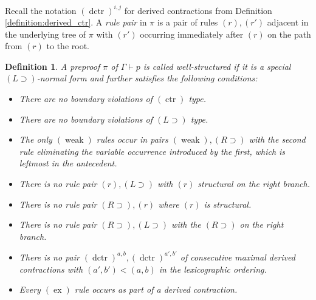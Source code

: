 \documentclass[english,letter paper,12pt,leqno]{article}
\theoremstyle{example}
\newtheorem{definition}[theorem]{Definition}
\numberwithin{equation}{section}
\def\imp{\supset}
\begin{document}
Recall the notation $(\operatorname{dctr})^{i,j}$ for derived contractions from Definition \ref{definition:derived_ctr}. A \emph{rule pair} in $\pi$ is a pair of rules $(r),(r')$ adjacent in the underlying tree of $\pi$ with $(r')$ occurring immediately after $(r)$ on the path from $(r)$ to the root.

\begin{definition} A preproof $\pi$ of $\Gamma \vdash p$ is called \emph{well-structured} if it is a special $(L \imp)$-normal form and further satisfies the following conditions:
\begin{itemize}
\item[(a)] There are no boundary violations of $(\operatorname{ctr})$ type.
\item[(b)] There are no boundary violations of $(L \imp)$ type.
\item[(c)] The only $(\operatorname{weak})$ rules occur in pairs $(\operatorname{weak}), (R \imp)$ with the second rule eliminating the variable occurrence introduced by the first, which is leftmost in the antecedent.
\item[(d)] There is no rule pair $(r), (L \imp)$ with $(r)$ structural on the right branch.
\item[(e)] There is no rule pair $(R \imp), (r)$ where $(r)$ is structural.
\item[(f)] There is no rule pair $(R \imp), (L \imp)$ with the $(R \imp)$ on the right branch.
\item[(g)] There is no pair $(\operatorname{dctr})^{a,b}, (\operatorname{dctr})^{a',b'}$ of consecutive maximal derived contractions with $(a',b') < (a,b)$ in the lexicographic ordering.
\item[(h)] Every $(\operatorname{ex})$ rule occurs as part of a derived contraction.
\end{itemize}
\end{definition}
\end{document}
